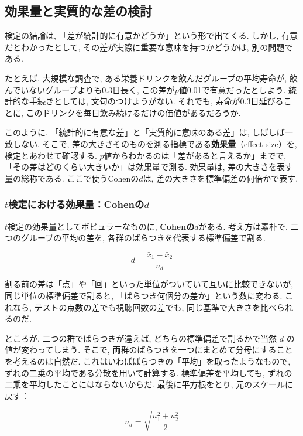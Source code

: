   \subsection{効果量と実質的な差の検討}

    検定の結論は, 「差が統計的に有意かどうか」という形で出てくる.
    しかし, 有意だとわかったとして, その差が実際に重要な意味を持つかどうかは, 別の問題である.

    たとえば, 大規模な調査で, ある栄養ドリンクを飲んだグループの平均寿命が, 飲んでいないグループよりも0.3日長く, この差が$p$値0.01で有意だったとしよう.
    統計的な手続きとしては, 文句のつけようがない.
    それでも, 寿命が0.3日延びることに, このドリンクを毎日飲み続けるだけの価値があるだろうか.

    このように, 「統計的に有意な差」と「実質的に意味のある差」は, しばしば一致しない.
    そこで, 差の大きさそのものを測る指標である\textbf{効果量}（effect size）を, 検定とあわせて確認する.
    $p$値からわかるのは「差があると言えるか」までで, 「その差はどのくらい大きいか」は効果量で測る.
    効果量は, 差の大きさを表す量の総称である. ここで使うCohenの$d$は, 差の大きさを標準偏差の何倍かで表す.

    \subsubsection*{\texorpdfstring{$t$}{t}検定における効果量：Cohenの\texorpdfstring{$d$}{d}}

    $t$検定の効果量としてポピュラーなものに, \textbf{Cohenの$d$}がある.
    考え方は素朴で, 二つのグループの平均の差を, 各群のばらつきを代表する標準偏差で割る.

    \[
      d = \frac{\bar{x}_1 - \bar{x}_2}{u_d}
    \]

    割る前の差は「点」や「回」といった単位がついていて互いに比較できないが, 同じ単位の標準偏差で割ると, 「ばらつき何個分の差か」という数に変わる.
    これなら, テストの点数の差でも視聴回数の差でも, 同じ基準で大きさを比べられるのだ.

    ところが, 二つの群でばらつきが違えば, どちらの標準偏差で割るかで当然 $d$ の値が変わってしまう.
    そこで, 両群のばらつきを一つにまとめて分母にすることを考えるのは自然だ.
    これはいわばばらつきの「平均」を取ったようなもので, ずれの二乗の平均である分散を用いて計算する.
    標準偏差を平均しても, ずれの二乗を平均したことにはならないからだ.
    最後に平方根をとり, 元のスケールに戻す：

    \[
      u_d = \sqrt{\frac{u_1^2 + u_2^2}{2}}
    \]

